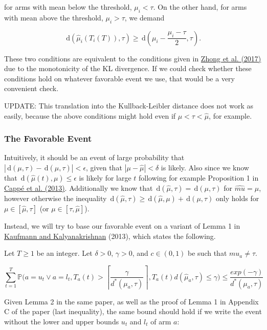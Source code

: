 \documentclass[12pt,]{article}
\newcommand{\der}{\,\text{d}}
\begin{document}
for arms with mean below the threshold, \(\mu_i < \tau\). On the other
hand, for arms with mean above the threshold, \(\mu_i > \tau\), we
demand

\[
\der(\hat{\mu}_i(T_i(T)), \tau) \geq \der(\mu_i - \frac{\mu_i - \tau}{2}, \tau).
\]

These two conditions are equivalent to the conditions given in
\href{https://arxiv.org/pdf/1704.04567.pdf}{Zhong et al. (2017)} due to
the monotonicity of the KL divergence. If we could check whether these
conditions hold on whatever favorable event we use, that would be a very
convenient check.

UPDATE: This translation into the Kullback-Leibler distance does not
work as easily, because the above conditions might hold even if
\(\mu < \tau < \hat{\mu}\), for example.

\subsubsection{The Favorable Event}\label{the-favorable-event}

Intuitively, it should be an event of large probability that
\(|\der(\mu,\tau) - \der(\hat{\mu},\tau)|<\epsilon\), given that
\(|\mu - \hat{\mu}|<\delta\) is likely. Also since we know that
\(\der(\hat{\mu}(t), \mu) \leq \epsilon\) is likely for large \(t\)
following for example Proposition 1 in
\href{https://projecteuclid.org/download/pdfview_1/euclid.aos/1375362558}{Cappé
et al. (2013)}. Additionally we know that
\(\der(\hat{\mu}, \tau) = \der(\mu, \tau)\) for \(\hat{mu} = \mu\),
however otherwise the inequality
\(\der(\hat{\mu}, \tau) \geq \der(\hat{\mu}, \mu) + \der(\mu, \tau)\)
only holds for \(\mu \in [\hat{\mu}, \tau]\) (or
\(\mu \in [\tau, \hat{\mu}]\)).

Instead, we will try to base our favorable event on a variant of Lemma 1
in \href{http://proceedings.mlr.press/v30/Kaufmann13.pdf}{Kaufmann and
Kalyanakrishnan} (2013), which states the following.

Let \(T \geq 1\) be an integer. Let \(\delta > 0\), \(\gamma > 0\), and
\(c \in (0,1)\) be such that \(mu_a \neq \tau\).

\[
\sum_{t=1}^T \mathbb{P} \Big(a = u_t \lor a = l_t, T_a(t) > \left \lceil{\frac{\gamma}{d^*(\mu_a,\tau)}}\right \rceil, T_a(t) d(\hat{\mu}_a, \tau) \leq \gamma \Big) \leq \frac{exp(-\gamma)}{d^*(\mu_a, \tau)}
\]

Given Lemma 2 in the same paper, as well as the proof of Lemma 1 in
Appendix C of the paper (last inequality), the same bound should hold if
we write the event without the lower and upper bounds \(u_t\) and
\(l_t\) of arm \(a\):
\end{document}
